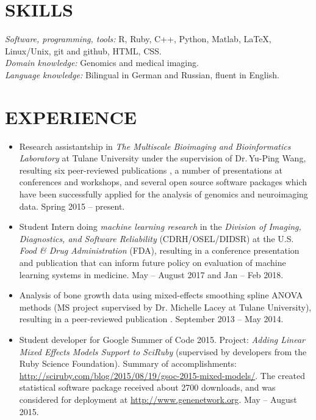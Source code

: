 \documentclass[margin]{res} %
\begin{document}
\begin{resume}
\section{SKILLS}

{\sl Software, programming, tools:} R, Ruby, C++, Python, Matlab, \LaTeX, Linux/Unix, git and github, HTML, CSS.\\
{\sl Domain knowledge:} Genomics and medical imaging.\\
{\sl Language knowledge:} Bilingual in German and Russian, fluent in English.


\section{EXPERIENCE}

\begin{itemize}
  \item Research assistantship in \emph{The Multiscale Bioimaging and Bioinformatics Laboratory} at Tulane University under the supervision of {Dr.\,Yu-Ping Wang}, resulting six peer-reviewed publications \cite{gossmann2015, cao2015BCB, cao2015bioinformatics, Gossmann2017-yu, brzyski2016, Gossmann2017-ln}, a number of presentations at conferences and workshops, and several open source software packages which have been successfully applied for the analysis of genomics and neuroimaging data. Spring 2015 -- present.
  \item Student Intern doing \emph{machine learning research} in the \emph{Division of Imaging, Diagnostics, and Software Reliability} (CDRH/OSEL/DIDSR) at the U.S. \emph{Food \& Drug Administration} (FDA), resulting in a conference presentation and publication \cite{gossmann2018} that can inform future policy on evaluation of machine learning systems in medicine. May -- August 2017 and Jan -- Feb 2018.
  \item Analysis of bone growth data using mixed-effects smoothing spline ANOVA methods (MS project supervised by Dr. Michelle Lacey at Tulane University), resulting in a peer-reviewed publication \cite{sammarco2015}. September 2013 -- May 2014.
  \item Student developer for Google Summer of Code 2015. Project: \emph{Adding Linear Mixed Effects Models Support to SciRuby} (supervised by developers from the Ruby Science Foundation). Summary of accomplishments: \url{http://sciruby.com/blog/2015/08/19/gsoc-2015-mixed-models/}. The created statistical software package received about 2700 downloads, and was considered for deployment at \url{http://www.genenetwork.org}. May -- August 2015.

\end{itemize}
\end{resume}
\end{document}

